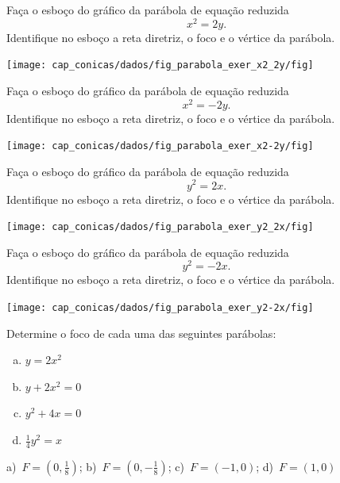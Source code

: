 \begin{exer}
  Faça o esboço do gráfico da parábola de equação reduzida
  \begin{equation}
    x^2 = 2y.
  \end{equation}
  Identifique no esboço a reta diretriz, o foco e o vértice da parábola.
\end{exer}
\begin{resp}
  \texttt{[image: cap\_conicas/dados/fig\_parabola\_exer\_x2\_2y/fig]}
\end{resp}

\begin{exer}
  Faça o esboço do gráfico da parábola de equação reduzida
  \begin{equation}
    x^2 = -2y.
  \end{equation}
  Identifique no esboço a reta diretriz, o foco e o vértice da parábola.
\end{exer}
\begin{resp}
  \texttt{[image: cap\_conicas/dados/fig\_parabola\_exer\_x2-2y/fig]}
\end{resp}

\begin{exer}
  Faça o esboço do gráfico da parábola de equação reduzida
  \begin{equation}
    y^2 = 2x.
  \end{equation}
  Identifique no esboço a reta diretriz, o foco e o vértice da parábola.
\end{exer}
\begin{resp}
  \texttt{[image: cap\_conicas/dados/fig\_parabola\_exer\_y2\_2x/fig]}
\end{resp}

\begin{exer}
  Faça o esboço do gráfico da parábola de equação reduzida
  \begin{equation}
    y^2 = -2x.
  \end{equation}
  Identifique no esboço a reta diretriz, o foco e o vértice da parábola.
\end{exer}
\begin{resp}
  \texttt{[image: cap\_conicas/dados/fig\_parabola\_exer\_y2-2x/fig]}
\end{resp}

\begin{exer}
  Determine o foco de cada uma das seguintes parábolas:
  \begin{enumerate}[a)]
  \item $y = 2x^2$
  \item $y + 2x^2 = 0$
  \item $y^2 + 4x = 0$
  \item $\frac{1}{4}y^2 = x$
  \end{enumerate}
\end{exer}
\begin{resp}
  a)~$F=(0, \frac{1}{8})$; b)~$F=(0, -\frac{1}{8})$; c)~$F=(-1, 0)$; d)~$F=(1, 0)$
\end{resp}
